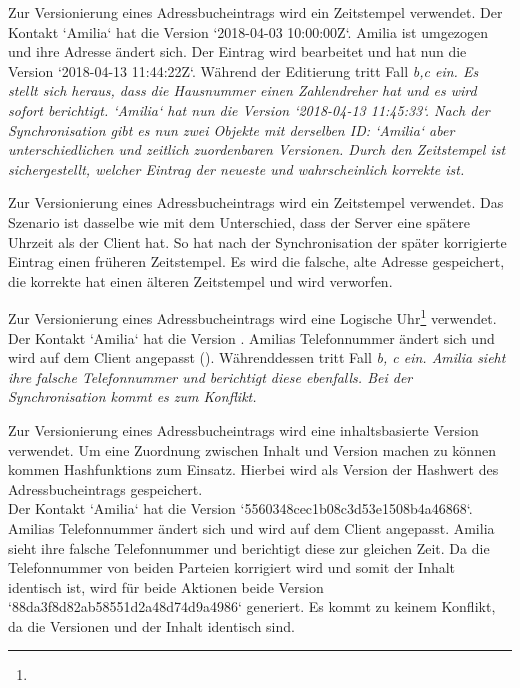 \begin{description}[leftmargin=0.5cm,style=nextline]
  \item[Szenario V1:]%
  Zur Versionierung eines Adressbucheintrags wird ein Zeitstempel verwendet. Der Kontakt `Amilia` hat die Version `2018-04-03 10:00:00Z`. Amilia ist umgezogen und ihre Adresse ändert sich. Der Eintrag wird bearbeitet und hat nun die Version `2018-04-13 11:44:22Z`. Während der Editierung tritt Fall \it{b,c} ein. Es stellt sich heraus, dass die Hausnummer einen Zahlendreher hat und es wird sofort berichtigt. `Amilia` hat nun die Version `2018-04-13 11:45:33`. Nach der Synchronisation gibt es nun zwei Objekte mit derselben ID: `Amilia` aber unterschiedlichen und zeitlich zuordenbaren Versionen. Durch den Zeitstempel ist sichergestellt, welcher Eintrag der neueste und wahrscheinlich korrekte ist.\\
  \item[Szenario V2:]%
  Zur Versionierung eines Adressbucheintrags wird ein Zeitstempel verwendet. Das Szenario ist dasselbe wie  mit dem Unterschied, dass der Server eine spätere Uhrzeit als der Client hat. So hat nach der Synchronisation der später korrigierte Eintrag einen früheren Zeitstempel. Es wird die falsche, alte Adresse gespeichert, die korrekte hat einen älteren Zeitstempel und wird verworfen.\\
  \item[Szenario V3:]%
  Zur Versionierung eines Adressbucheintrags wird eine Logische Uhr\footnote{\logicalclock} verwendet. Der Kontakt `Amilia` hat die Version . Amilias Telefonnummer ändert sich und wird auf dem Client angepasst (). Währenddessen tritt Fall \it{b, c} ein. Amilia sieht ihre falsche Telefonnummer und berichtigt diese ebenfalls.  Bei der Synchronisation kommt es zum Konflikt. \\
  \item[Szenario V4:]%
  Zur Versionierung eines Adressbucheintrags wird eine inhaltsbasierte Version verwendet. Um eine Zuordnung zwischen Inhalt und Version machen zu können kommen \Glspl{Hashfunktion} zum Einsatz. Hierbei wird als Version der Hashwert des Adressbucheintrags gespeichert.\\
  Der Kontakt `Amilia` hat die Version `5560348cec1b08c3d53e1508b4a46868`. Amilias Telefonnummer ändert sich und wird auf dem Client angepasst. Amilia sieht ihre falsche Telefonnummer und berichtigt diese zur gleichen Zeit. Da die Telefonnummer von beiden Parteien korrigiert wird und somit der Inhalt identisch ist, wird für beide Aktionen beide Version `88da3f8d82ab58551d2a48d74d9a4986` generiert. Es kommt zu keinem Konflikt, da die Versionen und der Inhalt identisch sind.\\

\end{description}
